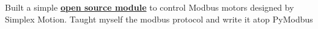 \documentclass[]{deedy-resume-openfont}
\begin{document}
\begin{minipage}[t]{0.66\textwidth}
Built a simple \textbf{\href{https://github.com/srikanthsrnvs/pysimplex}{open source module}} to control Modbus motors designed by Simplex Motion. Taught myself the modbus protocol and write it atop PyModbus
\sectionsep


\end{minipage} 
\end{document}
